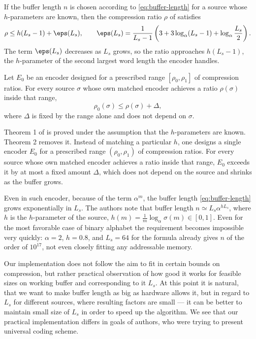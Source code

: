 \begin{theorem}
\label{thm:lz77-bound}
    If the buffer length \(n\) is chosen according to \eqref{eq:buffer-length} for a source whose \(h\)-parameters are known, then the compression ratio \(\rho\) of  satisfies
    \[
      \rho \leq h(L_s - 1) + \eps(L_s), \qquad
      \eps(L_s) = \frac{1}{L_s - 1}\left(3 + 3\log_\alpha (L_s - 1) + \log_\alpha \frac{L_s}{2}\right).
    \]
    The term \(\eps(L_s)\) decreases as \(L_s\) grows, so the ratio approaches \(h(L_s - 1)\), the \(h\)-parameter of the second largest word length the encoder handles.
\end{theorem}

\begin{theorem}
\label{thm:lz77-universal}
    Let \(E_0\) be an encoder designed for a prescribed range \([\rho_0, \rho_1]\) of compression ratios. For every source \(\sigma\) whose own matched encoder achieves a ratio \(\rho(\sigma)\) inside that range,
    \[
      \rho_0(\sigma) \leq \rho(\sigma) + \Delta,
    \]
    where \(\Delta\) is fixed by the range alone and does not depend on \(\sigma\).
\end{theorem}

Theorem 1 of \cite{ziv1977} is proved under the assumption that the \(h\)-parameters are known. Theorem 2 removes it. Instead of matching a particular \(h\), one designs a single encoder \(E_0\) for a prescribed range \((\rho_0, \rho_1)\) of compression ratios. For every source whose own matched encoder achieves a ratio inside that range, \(E_0\) exceeds it by at most a fixed amount \(\Delta\), which does not depend on the source and shrinks as the buffer grows.

Even in such encoder, because of the term \(\alpha^m\), the buffer length \eqref{eq:buffer-length} grows exponentially in \(L_s\). The authors note that buffer length \(n \simeq L_s \alpha^{h L_s}\), where \(h\) is the \(h\)-parameter of the source, \(h(m) = \frac{1}{m}\log_\alpha \sigma(m) \in [0, 1]\). Even for the most favorable case of binary alphabet the requirement becomes impossible very quickly: \(\alpha = 2\), \(h = 0.8\), and \(L_s = 64\) for the formula already gives \(n\) of the order of \(10^{17}\), not even closely fitting any addressable memory.

Our implementation does not follow the aim to fit in certain bounds on compression, but rather practical observation of how good it works for feasible sizes on working buffer and corresponding to it \(L_s\). At this point it is natural, that we want to make buffer length as big as hardware allows it, but in regard to \(L_s\) for different sources, where resulting factors are small --- it can be better to maintain small size of \(L_s\) in order to speed up the algorithm. We see that our practical implementation differs in goals of authors, who were trying to present universal coding scheme. 

